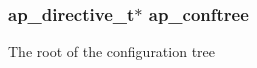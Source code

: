 \subsubsection[{\texorpdfstring{ap\+\_\+conftree}{ap_conftree}}]{ {\bf ap\+\_\+directive\+\_\+t}$\ast$ ap\+\_\+conftree}\hypertarget{group__APACHE__CORE__CONFIG__TREE_gaf55369733bb7702836b806e63ff41503}{}\label{group__APACHE__CORE__CONFIG__TREE_gaf55369733bb7702836b806e63ff41503}
The root of the configuration tree 